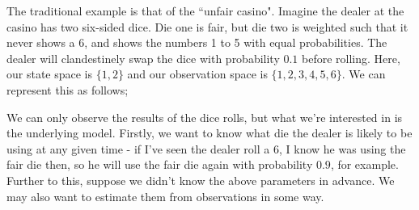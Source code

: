 The traditional example is that of the ``unfair casino". Imagine the dealer at the casino has two six-sided dice. Die one is fair, but die two is weighted such that it never shows a $6$, and shows the numbers 1 to 5 with equal probabilities. The dealer will clandestinely swap the dice with probability $0.1$ before rolling. Here, our state space is $\{1,2\}$ and our observation space is $\{1,2,3,4,5,6\}$. We can represent this as follows;

We can only observe the results of the dice rolls, but what we're interested in is the underlying model. Firstly, we want to know what die the dealer is likely to be using at any given time - if I've seen the dealer roll a 6, I know he was using the fair die then, so he will use the fair die again with probability $0.9$, for example. Further to this, suppose we didn't know the above parameters in advance. We may also want to estimate them from observations in some way.